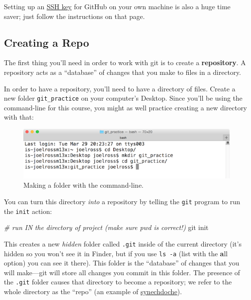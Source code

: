 \documentclass[]{book}
\newenvironment{Shaded}{\begin{snugshade}}{\end{snugshade}}
\newcommand{\CommentTok}[1]{\textcolor[rgb]{0.56,0.35,0.01}{\textit{#1}}}
\newcommand{\FunctionTok}[1]{\textcolor[rgb]{0.00,0.00,0.00}{#1}}
\newcommand{\NormalTok}[1]{#1}
\theoremstyle{definition}
\theoremstyle{definition}
\theoremstyle{remark}
\begin{document}
Setting up an
\href{https://help.github.com/articles/generating-a-new-ssh-key-and-adding-it-to-the-ssh-agent}{SSH
key} for GitHub on your own machine is also a huge time saver; just
follow the instructions on that page.

\subsection{Creating a Repo}\label{creating-a-repo}

The first thing you'll need in order to work with git is to create a
\textbf{repository}. A repository acts as a ``database'' of changes that
you make to files in a directory.

In order to have a repository, you'll need to have a directory of files.
Create a new folder \texttt{git\_practice} on your computer's Desktop.
Since you'll be using the command-line for this course, you might as
well practice creating a new directory with that:

\begin{figure}
\centering
\includegraphics{img/git-basics/git-mkdir.png}
\caption{Making a folder with the command-line.}
\end{figure}

You can turn this directory \emph{into} a repository by telling the
\texttt{git} program to run the \texttt{init} action:

\begin{Shaded}
\begin{Highlighting}[]
\CommentTok{# run IN the directory of project (make sure pwd is correct!)}
\FunctionTok{git}\NormalTok{ init}
\end{Highlighting}
\end{Shaded}

This creates a new \emph{hidden} folder called \texttt{.git} inside of
the current directory (it's hidden so you won't see it in Finder, but if
you use \texttt{ls\ -a} (list with the \textbf{a}ll option) you can see
it there). This folder is the ``database'' of changes that you will
make---git will store all changes you commit in this folder. The
presence of the \texttt{.git} folder causes that directory to become a
repository; we refer to the whole directory as the ``repo'' (an example
of \href{https://en.wikipedia.org/wiki/Synecdoche}{synechdoche}).
\end{document}
